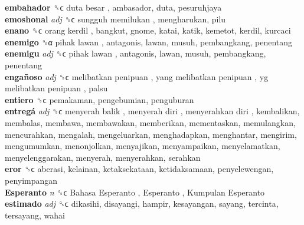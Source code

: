 \textbf{embahador} ␝ϲ   duta besar , ambasador, duta, pesuruhjaya  \\
\textbf{emoshonal} \emph{adj}  ␝ϲ   sungguh memilukan , mengharukan, pilu  \\
\textbf{enano} ␝ϲ   orang kerdil , bangkut, gnome, katai, katik, kemetot, kerdil, kurcaci  \\
\textbf{enemigo} ␝α   pihak lawan , antagonis, lawan, musuh, pembangkang, penentang  \\
\textbf{enemigu} \emph{adj}  ␝ϲ   pihak lawan , antagonis, lawan, musuh, pembangkang, penentang  \\
\textbf{engañoso} \emph{adj}  ␝ϲ   melibatkan penipuan ,  yang melibatkan penipuan ,  yg melibatkan penipuan , palsu  \\
\textbf{entiero} ␝ϲ  pemakaman, pengebumian, penguburan  \\
\textbf{entregá} \emph{adj}  ␝ϲ   menyerah balik ,  menyerah diri ,  menyerahkan diri , kembalikan, membalas, membawa, membawakan, memberikan, mementaskan, memulangkan, mencurahkan, mengalah, mengeluarkan, menghadapkan, menghantar, mengirim, mengumumkan, menonjolkan, menyajikan, menyampaikan, menyelamatkan, menyelenggarakan, menyerah, menyerahkan, serahkan  \\
\textbf{eror} ␝ϲ  aberasi, kelainan, ketaksekataan, ketidaksamaan, penyelewengan, penyimpangan  \\
\textbf{Esperanto} \emph{n}  ␝ϲ   Bahasa Esperanto ,  Esperanto ,  Kumpulan Esperanto   \\
\textbf{estimado} \emph{adj}  ␝ϲ  dikasihi, disayangi, hampir, kesayangan, sayang, tercinta, tersayang, wahai  \\
